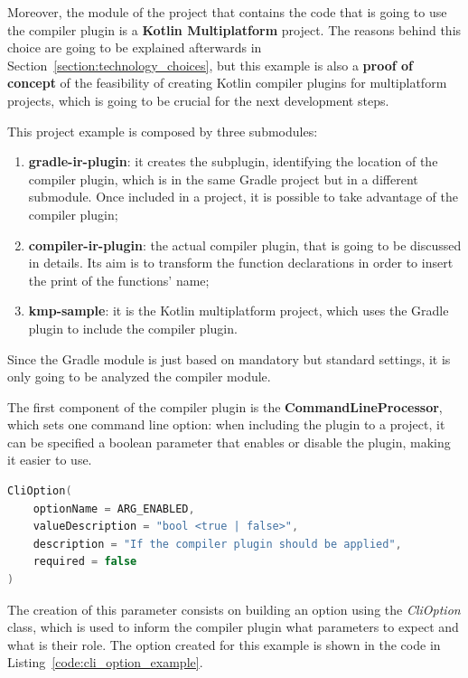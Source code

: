 Moreover, the module of the project that contains the code that is going to use the compiler plugin is a \textbf{Kotlin Multiplatform} project. The reasons behind this choice are going to be explained afterwards in Section~\ref{section:technology_choices}, but this example is also a \textbf{proof of concept} of the feasibility of creating Kotlin compiler plugins for multiplatform projects, which is going to be crucial for the next development steps.

This project example is composed by three submodules:
\begin{enumerate}
    \item \textbf{gradle-ir-plugin}: it creates the subplugin, identifying the location of the compiler plugin, which is in the same Gradle project but in a different submodule. Once included in a project, it is possible to take advantage of the compiler plugin;
    \item \textbf{compiler-ir-plugin}: the actual compiler plugin, that is going to be discussed in details. Its aim is to transform the function declarations in order to insert the print of the functions' name;
    \item \textbf{kmp-sample}: it is the Kotlin multiplatform project, which uses the Gradle plugin to include the compiler plugin.
\end{enumerate}

Since the Gradle module is just based on mandatory  but standard settings, it is only going to be analyzed the compiler module.

The first component of the compiler plugin is the \textbf{CommandLineProcessor}, which sets one command line option: when including the plugin to a project, it can be specified a boolean parameter that enables or disable the plugin, making it easier to use.
\begin{lstlisting}[caption={Creation of compiler option that enables or disables the plugin}, captionpos=b, language=Kotlin, label={code:cli_option_example}]
CliOption(
    optionName = ARG_ENABLED,
    valueDescription = "bool <true | false>",
    description = "If the compiler plugin should be applied",
    required = false
)
\end{lstlisting}
The creation of this parameter consists on building an option using the \textit{CliOption} class, which is used to inform the compiler plugin what parameters to expect and what is their role. The option created for this example is shown in the code in Listing~\ref{code:cli_option_example}.

